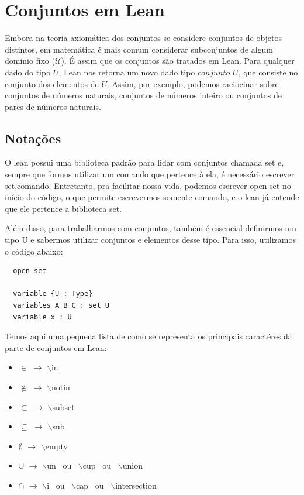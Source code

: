 \section{Conjuntos em Lean}
Embora na teoria axiomática dos conjuntos se considere conjuntos de objetos distintos, em matemática é mais comum considerar subconjuntos de algum dominio fixo ($\mathcal U $). É assim que os conjuntos são tratados em Lean. Para qualquer dado do tipo $U$, Lean nos retorna um novo dado tipo $conjunto$ $U$, que consiste no conjunto dos elementos de $U$. Assim, por exemplo, podemos raciocinar sobre conjuntos de números naturais, conjuntos de números inteiro ou conjuntos de pares de números naturais.

  \subsection{Notações}
  O lean possui uma biblioteca padrão para lidar com conjuntos chamada set e, sempre que formos utilizar um comando que pertence à ela, é necessário escrever {\selectfont set.comando}. Entretanto, pra facilitar nossa vida, podemos escrever {\selectfont open set} no início do código, o que permite escrevermos somente {\selectfont comando}, e o lean já entende que ele pertence a biblioteca set.
  
  Além disso, para trabalharmos com conjuntos, também é essencial definirmos um tipo {\selectfont U} e sabermos utilizar conjuntos e elementos desse tipo. Para isso, utilizamos o código abaixo:

  \begin{lstlisting}
  open set

  variable {U : Type}
  variables A B C : set U
  variable x : U \end{lstlisting}

  Temos aqui uma pequena lista de como se representa os principais caractéres da parte de conjuntos em Lean: 

  \begin{itemize}
      \item $\in$ $\rightarrow$ $\backslash$in
    
      \item $\notin$ $\rightarrow$ $\backslash$notin
    
      \item $\subset$ $\rightarrow$ $\backslash$subset
    
      \item $\subseteq$ $\rightarrow$ $\backslash$sub
    
      \item $\emptyset$ $\rightarrow$ $\backslash$empty
    
      \item $\cup$ $\rightarrow$ $\backslash$un \ ou \ $\backslash$cup \ ou \ $\backslash$union
    
      \item $\cap$ $\rightarrow$ $\backslash$i \ ou \ $\backslash$cap \ ou \ $\backslash$intersection
  \end{itemize}

